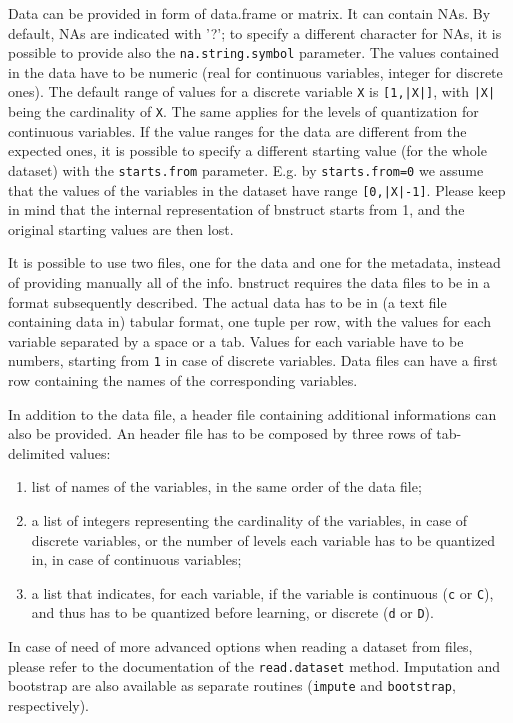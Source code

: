 \documentclass{article}\usepackage[]{graphicx}\usepackage[]{color}
\begin{document}
Data can be provided in form of data.frame or matrix. It can contain NAs. By default, NAs are indicated with '?';
to specify a different character for NAs, it is possible to provide also the \texttt{na.string.symbol} parameter.
The values contained in the data have to be numeric (real for continuous variables, integer for discrete ones).
The default range of values for a discrete variable \texttt{X} is \texttt{[1,|X|]}, with \texttt{|X|} being
the cardinality of \texttt{X}. The same applies for the levels of quantization for continuous variables.
If the value ranges for the data are different from the expected ones, it is possible to specify a different
starting value (for the whole dataset) with the \texttt{starts.from} parameter. E.g. by \texttt{starts.from=0}
we assume that the values of the variables in the dataset have range \texttt{[0,|X|-1]}.
Please keep in mind that the internal representation of bnstruct starts from 1,
and the original starting values are then lost. 

It is possible to use two files, one for the data and one for the metadata,
instead of providing manually all of the info. 
bnstruct requires the data files to be in a format subsequently described.
The actual data has to be in (a text file containing data in) tabular format, one tuple per row,
with the values for each variable separated by a space or a tab. Values for each variable have to be
numbers, starting from \texttt{1} in case of discrete variables.
Data files can have a first row containing the names of the corresponding variables.

In addition to the data file, a header file containing additional informations can also be provided.
An header file has to be composed by three rows of tab-delimited values:
\begin{enumerate}
\item list of names of the variables, in the same order of the data file;
\item a list of integers representing the cardinality of the variables, in case of discrete variables,
 or the number of levels each variable has to be quantized in, in case of continuous variables;
\item a list that indicates, for each variable, if the variable is continuous
 (\texttt{c} or \texttt{C}), and thus has to be quantized before learning,
 or discrete (\texttt{d} or \texttt{D}).
\end{enumerate}
In case of need of more advanced options when reading a dataset from files, please refer to the
documentation of the \texttt{read.dataset} method. Imputation and bootstrap are also available
as separate routines (\texttt{impute} and \texttt{bootstrap}, respectively).
\end{document}
